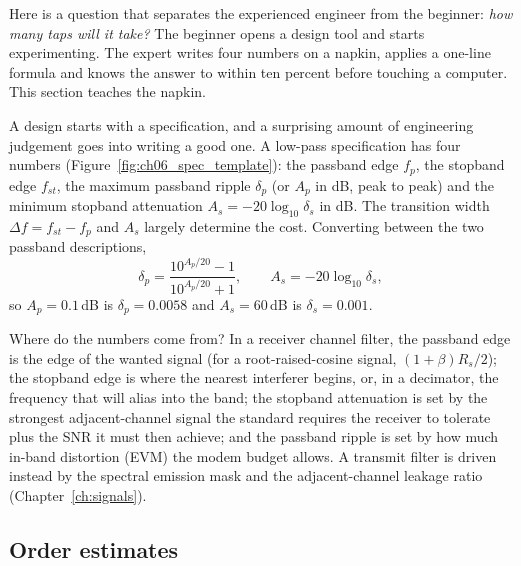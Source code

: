 Here is a question that separates the experienced engineer from the beginner: \emph{how many taps
will it take?} The beginner opens a design tool and starts experimenting. The expert writes four
numbers on a napkin, applies a one-line formula and knows the answer to within ten percent before
touching a computer. This section teaches the napkin.

A design starts with a specification, and a surprising amount of engineering judgement goes into
writing a good one. A low-pass specification has four numbers (Figure~\ref{fig:ch06_spec_template}):
the passband edge $f_p$, the stopband edge $f_{st}$, the maximum passband ripple $\delta_p$ (or
$A_p$ in dB, peak to peak) and the minimum stopband attenuation $A_s=-20\log_{10}\delta_s$ in dB.
The transition width $\Delta f=f_{st}-f_p$ and $A_s$ largely determine the cost. Converting between
the two passband descriptions,
\begin{equation}
\delta_p=\frac{10^{A_p/20}-1}{10^{A_p/20}+1},\qquad A_s=-20\log_{10}\delta_s,
\end{equation}
so $A_p=0.1$\,dB is $\delta_p=0.0058$ and $A_s=60$\,dB is $\delta_s=0.001$.

Where do the numbers come from? In a receiver channel filter, the passband edge is the edge of the
wanted signal (for a root-raised-cosine signal, $(1+\beta)R_s/2$); the stopband edge is where the
nearest interferer begins, or, in a decimator, the frequency that will alias into the band; the
stopband attenuation is set by the strongest adjacent-channel signal the standard requires the
receiver to tolerate plus the SNR it must then achieve; and the passband ripple is set by how much
in-band distortion (EVM) the modem budget allows. A transmit filter is driven instead by the
spectral emission mask and the adjacent-channel leakage ratio (Chapter~\ref{ch:signals}).



\subsection{Order estimates}

